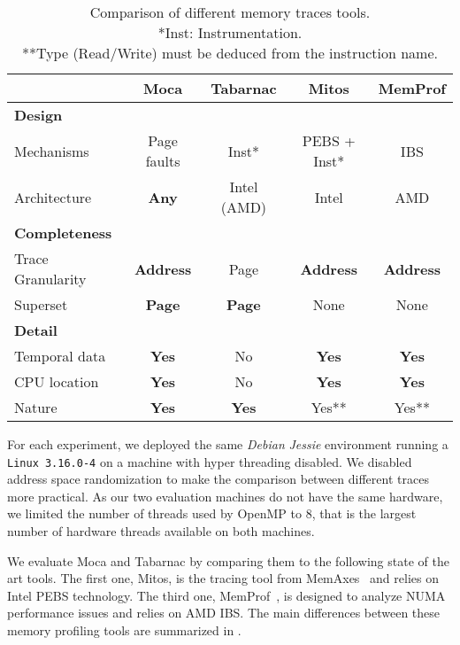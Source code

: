 \begin{table}[htb]
    \centering
    \begin{tabular}{lcccc}
        \toprule
         & \textbf{Moca} & \textbf{Tabarnac} & \textbf{Mitos} & \textbf{MemProf} \\
            \midrule
            \textbf{Design} & & & &\\
            \midrule
            Mechanisms   & Page faults  & Inst* & PEBS + Inst* & IBS \\
            Architecture & \textbf{Any} & Intel (AMD) & Intel & AMD   \\
            \midrule
            \textbf{Completeness} & & & &\\
            \midrule
            Trace Granularity & \textbf{Address} & Page          & \textbf{Address} & \textbf{Address} \\
            Superset          & \textbf{Page} & \textbf{Page} & None             & None             \\
            \midrule
            \textbf{Detail} & & & &\\
            \midrule
            Temporal data & \textbf{Yes} & No          & \textbf{Yes} & \textbf{Yes} \\
            CPU location  & \textbf{Yes} & No          & \textbf{Yes} & \textbf{Yes} \\
            Nature        & \textbf{Yes} &\textbf{Yes} & Yes**         & Yes**       \\
        \bottomrule
    \end{tabular}
    \caption[Comparison of different memory traces tools.]
    {Comparison of different memory traces tools.\\
        *Inst: Instrumentation.\\
        **Type (Read/Write) must be deduced from the instruction name.}
        \label{tab:tools-comp}
\end{table}


For each experiment, we deployed the same \emph{Debian} \emph{Jessie} environment running a \texttt{Linux 3.16.0-4} on a machine with hyper threading disabled.
We disabled address space randomization to make the comparison between different traces more practical.
As our two evaluation machines do not have the same hardware, we limited the number of threads used by \gls{OpenMP} to $8$, that is the largest number of hardware threads available on both machines.


We evaluate \gls{Moca} and \gls{Tabarnac} by comparing them to the following state of the art tools. The first one,
\gls{Mitos}, is the tracing tool from \gls{MemAxes}~\cite{Gimenez14Dissecting} and relies on \gls{Intel} \gls{PEBS} technology.
The third one, \gls{MemProf}~\cite{Lachaize12MemProf}, is designed to analyze \gls{NUMA} performance issues and relies on \gls{AMD} \gls{IBS}.
The main differences between these memory profiling tools are summarized in .

